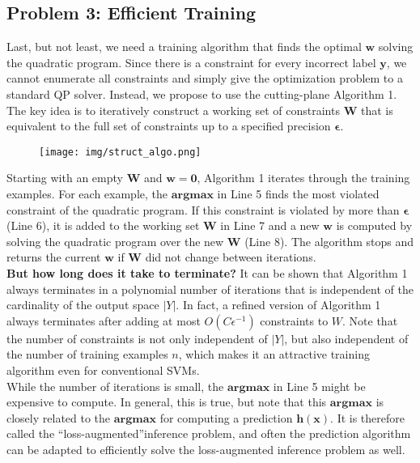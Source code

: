 \documentclass[twoside]{article}
\begin{document}
\subsection{Problem 3: Efficient Training}

Last, but not least, we need a training algorithm that finds
the optimal $\mathbf{w}$ solving the quadratic program. Since
there is a constraint for every incorrect label $\mathbf{y}$, we cannot
enumerate all constraints and simply give the optimization problem to a standard QP solver. Instead, we propose to use the cutting-plane Algorithm 1. The key idea is to iteratively construct
a working set of constraints $\mathbf{W}$ that is equivalent to the full
set of constraints  up to a specified precision $\mathbf{\epsilon}$.

\begin{figure}[h]
\centering
\texttt{[image: img/struct\_algo.png]}
\end{figure}


Starting
with an empty $\mathbf{W}$ and $\mathbf{w=0}$, Algorithm 1 iterates through
the training examples. For each example, the $\mathbf{argmax}$ in Line 5 finds the most violated constraint of the quadratic
program. If this constraint is violated by more than $\mathbf{\epsilon}$ (Line 6), it is added to the working set $\mathbf{W}$ in Line 7 and a
new $\mathbf{w}$ is computed by solving the quadratic program over
the new $\mathbf{W}$ (Line 8). The algorithm stops and returns the
current $\mathbf{w}$ if $\mathbf{W}$ did not change between iterations.\\ 

\textbf{But how long does
it take to terminate?} It can be shown that Algorithm 1
always terminates in a polynomial number of iterations that is independent of the cardinality of the output space $|Y|$. In
fact, a refined version of Algorithm 1  always terminates after adding at most $O(C\epsilon^{-1})$ constraints to $W$. Note that the number of constraints
is not only independent of $|Y|$, but also independent of the
number of training examples $n$, which makes it an attractive
training algorithm even for conventional SVMs. \\
While the number of iterations is small, the $\mathbf{argmax}$ in
Line 5 might be expensive to compute. In general, this is
true, but note that this $\mathbf{argmax}$ is closely related to the
$\mathbf{argmax}$ for computing a prediction $\mathbf{h(x)}$. It is therefore
called the “loss-augmented”inference problem, and often the
prediction algorithm can be adapted to efficiently solve the
loss-augmented inference problem as well.
\end{document}

